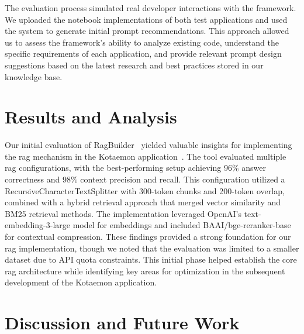 \documentclass[12pt,twoside,english]{article}
\begin{document}
The evaluation process simulated real developer interactions with the framework. We uploaded the notebook implementations of both test applications and used the system to generate initial prompt recommendations. This approach allowed us to assess the framework's ability to analyze existing code, understand the specific requirements of each application, and provide relevant prompt design suggestions based on the latest research and best practices stored in our knowledge base.

\clearpage

\section{Results and Analysis}
Our initial evaluation of RagBuilder~\cite{KruxAI2024RagBuilder} yielded valuable insights for implementing the \gls{rag} mechanism in the Kotaemon application~\cite{Cinnamon2024Kotaemon}. The tool evaluated multiple \gls{rag} configurations, with the best-performing setup achieving 96\% answer correctness and 98\% context precision and recall. This configuration utilized a RecursiveCharacterTextSplitter with 300-token chunks and 200-token overlap, combined with a hybrid retrieval approach that merged vector similarity and BM25 retrieval methods. The implementation leveraged OpenAI's text-embedding-3-large model for embeddings and included BAAI/bge-reranker-base for contextual compression. These findings provided a strong foundation for our \gls{rag} implementation, though we noted that the evaluation was limited to a smaller dataset due to API quota constraints. This initial phase helped establish the core \gls{rag} architecture while identifying key areas for optimization in the subsequent development of the Kotaemon application.


\clearpage
\section{Discussion and Future Work}


\clearpage


\end{document}
